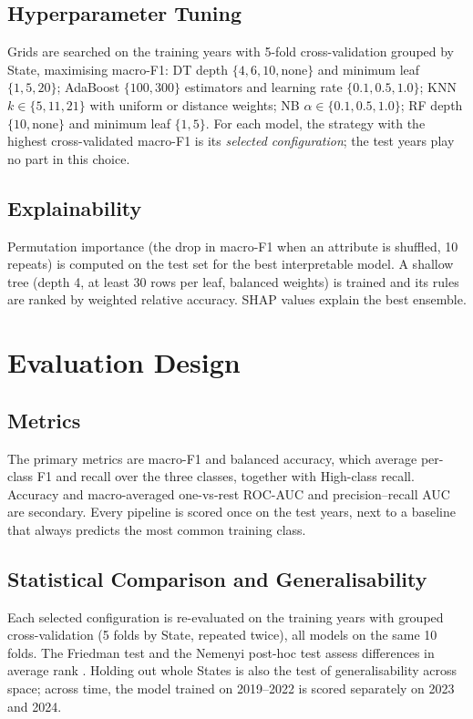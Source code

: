 \documentclass[conference]{IEEEtran}
\begin{document}
\subsection{Hyperparameter Tuning}
Grids are searched on the training years with 5-fold cross-validation grouped by State, maximising macro-F1: DT depth $\{4, 6, 10, \text{none}\}$ and minimum leaf $\{1, 5, 20\}$; AdaBoost $\{100, 300\}$ estimators and learning rate $\{0.1, 0.5, 1.0\}$; KNN $k \in \{5, 11, 21\}$ with uniform or distance weights; NB $\alpha \in \{0.1, 0.5, 1.0\}$; RF depth $\{10, \text{none}\}$ and minimum leaf $\{1, 5\}$. For each model, the strategy with the highest cross-validated macro-F1 is its \emph{selected configuration}; the test years play no part in this choice.

\subsection{Explainability}
Permutation importance (the drop in macro-F1 when an attribute is shuffled, 10 repeats) is computed on the test set for the best interpretable model. A shallow tree (depth 4, at least 30 rows per leaf, balanced weights) is trained and its rules are ranked by weighted relative accuracy. SHAP values \cite{lundberg2017} explain the best ensemble.

\section{Evaluation Design}
\label{sec:evaluation}

\subsection{Metrics}
The primary metrics are macro-F1 and balanced accuracy, which average per-class F1 and recall over the three classes, together with High-class recall. Accuracy and macro-averaged one-vs-rest ROC-AUC and precision--recall AUC are secondary. Every pipeline is scored once on the test years, next to a baseline that always predicts the most common training class.

\subsection{Statistical Comparison and Generalisability}
Each selected configuration is re-evaluated on the training years with grouped cross-validation (5 folds by State, repeated twice), all models on the same 10 folds. The Friedman test and the Nemenyi post-hoc test assess differences in average rank \cite{demsar2006}. Holding out whole States is also the test of generalisability across space; across time, the model trained on 2019--2022 is scored separately on 2023 and 2024.
\end{document}
